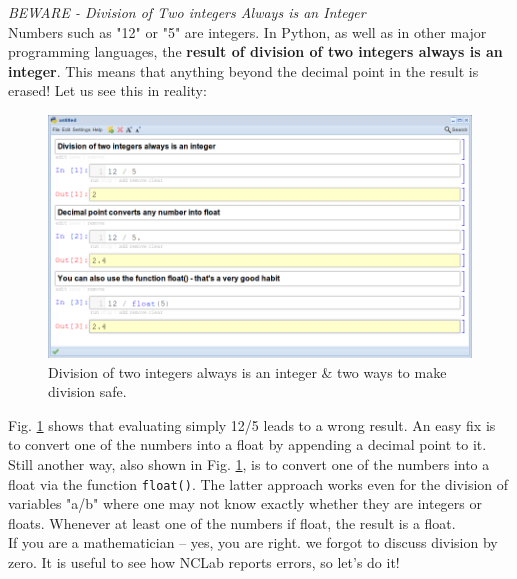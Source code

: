 \documentclass{article}
\begin{document}
\noindent
{\em BEWARE - Division of Two integers Always is an Integer}\\

Numbers such as "12" or "5" are integers. In Python, as well as 
in other major programming languages, the {\bf result of division of 
two integers always is an integer}. This means that anything beyond 
the decimal point in the result is erased! Let us see this in reality:

\newpage
\begin{figure}[!ht]
\begin{center}
\includegraphics[width=\textwidth]{img/div1.png}
\end{center}
\caption{Division of two integers always is an integer \& two ways to make division safe.}
\label{fig:div1}
\end{figure}
\noindent
Fig. \ref{fig:div1} shows that evaluating simply 12/5 leads to a wrong result. An easy fix is 
to convert one of the numbers into a float by appending a decimal point to it. Still
another way, also shown in  Fig. \ref{fig:div1}, is to convert one of the numbers into a float 
via the function {\tt float()}. The latter approach works even for the division of variables "a/b"
where one may not know exactly whether they are integers or floats. Whenever at least 
one of the numbers if float, the result is a float. \\

\noindent
If you are a mathematician -- yes, you are right. we forgot to discuss division by zero. 
It is useful to see how NCLab reports errors, so let's do it!
\end{document}
